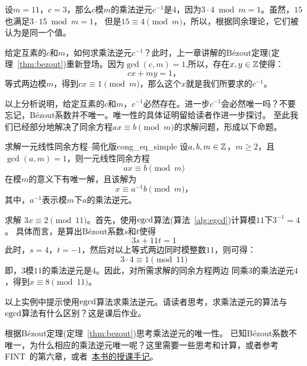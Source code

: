 \begin{example}
设$m = 11$，$c = 3$，那么$c$模$m$的乘法逆元$c^{-1}$是$4$，因为$3 \cdot 4 \bmod m =  1$。虽然，$15$也满足$3 \cdot 15 \bmod m = 1$，
但是$15 \equiv 4 \pmod{m}$，所以，根据同余理论，它们被认为是同一个值。
\end{example}

给定互素的$c$和$m$，如何求乘法逆元$c^{-1}$？此时，上一章讲解的B\'{e}zout定理(定理~\ref{thm:bezout})重新登场。因为$\gcd(c,m)=1$,所以，存在$x,y\in {\mathbb Z}$使得：
\[cx + my = 1\text{，}\]
等式两边模$m$，得到$c x \equiv 1 \pmod{m}$，那么这个$x$就是我们所要求的$c^{-1}$。

以上分析说明，给定互素的$c$和$m$，$c^{-1}$必然存在。进一步$c^{-1}$会必然唯一吗？不要忘记，B\'{e}zout系数并不唯一。唯一性的具体证明留给读者作进一步探讨。
至此我们已经部分地解决了同余方程$a x \equiv b \pmod{m}$的求解问题，形成以下命题。

\begin{proposition}{求解一元线性同余方程--简化版}{cong_eq_simple}
	设$a, b, m \in {\mathbb Z}$，$m \ge 2$，且$\gcd(a,m)=1$，则一元线性同余方程
  \[ax \equiv b \pmod{m}\]
  在模$m$的意义下有唯一解，且该解为
  \[x \equiv a^{-1}b \pmod{m}\text{，}\]
  其中，$a^{-1}$表示模$m$下$a$的乘法逆元。
\end{proposition}

\begin{example}
求解 $3 x \equiv 2 \pmod{11}$。首先，使用$\operatorname{egcd}$算法(算法~\ref{alg:egcd})计算模$11$下$3^{-1} = 4$。
具体而言，是算出B\'{e}zout系数$s$和$t$使得
\[ 3s + 11t = 1\]
此时，$s = 4$，$t = -1 $，然后对以上等式两边同时模整数$11$，则可得：
\[ 3 \cdot 4 \equiv 1 \pmod{11}\]
即，$3$模$11$的乘法逆元是$4$。因此，对所需求解的同余方程两边
同乘$3$的乘法逆元$4$，得到$x \equiv 8 \pmod{11}$。
\end{example}

\begin{thinking}
  以上实例中提示使用$\operatorname{egcd}$算法求乘法逆元。请读者思考，求乘法逆元的算法与$\operatorname{egcd}$算法有什么区别？这是课后作业。
\end{thinking}

\begin{thinking} 
根据B\'{e}zout定理(定理~\ref{thm:bezout})思考乘法逆元的唯一性。
已知B\'{e}zout系数不唯一，为什么相应的乘法逆元唯一呢？这里需要一些思考和计算，或者参考FINT~\cite{silverman2014friendly}的第六章，或者~\href{https://github.com/lbwang/CINTA-cn/blob/master/Notes/uniqueness-bezout.tex}{本书的授课手记}。
\end{thinking} 

